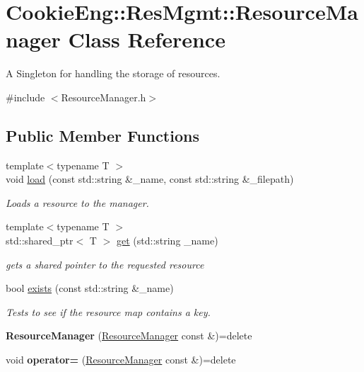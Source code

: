 \hypertarget{class_cookie_eng_1_1_res_mgmt_1_1_resource_manager}{}\section{Cookie\+Eng\+:\+:Res\+Mgmt\+:\+:Resource\+Manager Class Reference}
\label{class_cookie_eng_1_1_res_mgmt_1_1_resource_manager}


A Singleton for handling the storage of resources.  




{\ttfamily \#include $<$Resource\+Manager.\+h$>$}

\subsection*{Public Member Functions}
\begin{DoxyCompactItemize}
\item 
{\footnotesize template$<$typename T $>$ }\\void \hyperlink{class_cookie_eng_1_1_res_mgmt_1_1_resource_manager_abd8a726364757dbc45c6aed47dd8ba00}{load} (const std\+::string \&\+\_\+name, const std\+::string \&\+\_\+filepath)
\begin{DoxyCompactList}\small\item\em Loads a resource to the manager. \end{DoxyCompactList}\item 
{\footnotesize template$<$typename T $>$ }\\std\+::shared\+\_\+ptr$<$ T $>$ \hyperlink{class_cookie_eng_1_1_res_mgmt_1_1_resource_manager_adac3f1571c17315a1dc40d2f86425763}{get} (std\+::string \+\_\+name)
\begin{DoxyCompactList}\small\item\em gets a shared pointer to the requested resource \end{DoxyCompactList}\item 
bool \hyperlink{class_cookie_eng_1_1_res_mgmt_1_1_resource_manager_a8622e0f345edf02dc21c5e460049f130}{exists} (const std\+::string \&\+\_\+name)
\begin{DoxyCompactList}\small\item\em Tests to see if the resource map contains a key. \end{DoxyCompactList}\item 
\mbox{\label{class_cookie_eng_1_1_res_mgmt_1_1_resource_manager_aeeceeb2d2cc146aaf746b521f997d8f8}} 
{\bfseries Resource\+Manager} (\hyperlink{class_cookie_eng_1_1_res_mgmt_1_1_resource_manager}{Resource\+Manager} const \&)=delete
\item 
\mbox{\label{class_cookie_eng_1_1_res_mgmt_1_1_resource_manager_a3fe753cfd1948e98639320efc50d1d64}} 
void {\bfseries operator=} (\hyperlink{class_cookie_eng_1_1_res_mgmt_1_1_resource_manager}{Resource\+Manager} const \&)=delete
\end{DoxyCompactItemize}
